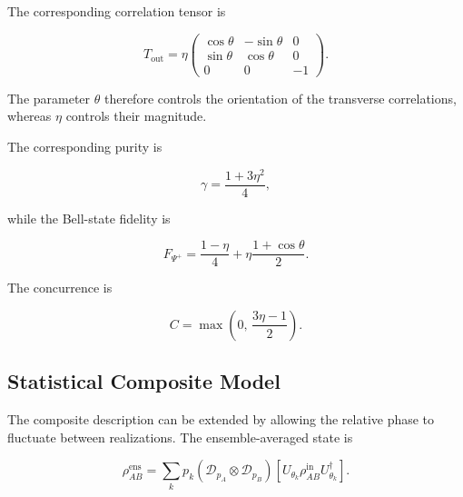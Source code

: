 The corresponding correlation tensor is

\begin{equation}
T_{\mathrm{out}}
=
\eta
\begin{pmatrix}
\cos\theta & -\sin\theta & 0\\
\sin\theta & \cos\theta & 0\\
0 & 0 & -1
\end{pmatrix}.
\label{eq:fixed_composite_tensor}
\end{equation}

The parameter \( \theta \) therefore controls the orientation of the transverse
correlations, whereas \( \eta \) controls their magnitude.

The corresponding purity is

\begin{equation}
\gamma
=
\frac{1+3\eta^2}{4},
\label{eq:fixed_composite_purity}
\end{equation}

while the Bell-state fidelity is

\begin{equation}
F_{\Psi^+}
=
\frac{1-\eta}{4}
+
\eta
\frac{1+\cos\theta}{2}.
\label{eq:fixed_composite_fidelity}
\end{equation}

The concurrence is

\begin{equation}
C
=
\max
\left(
0,\,
\frac{3\eta-1}{2}
\right).
\label{eq:fixed_composite_concurrence}
\end{equation}


\subsection{Statistical Composite Model}
\label{subsec:statistical_composite_model}

The composite description can be extended by allowing the relative phase to
fluctuate between realizations. The ensemble-averaged state is

\begin{equation}
\rho_{AB}^{\mathrm{ens}}
=
\sum_k p_k
\left(
\mathcal{D}_{p_A}
\otimes
\mathcal{D}_{p_B}
\right)
\left[
U_{\theta_k}
\rho_{AB}^{\mathrm{in}}
U_{\theta_k}^\dagger
\right].
\label{eq:statistical_composite_channel}
\end{equation}

